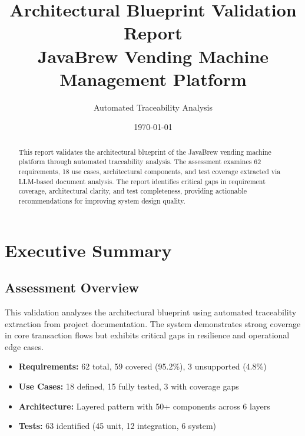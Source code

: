 \documentclass[11pt,a4paper]{article}
\title{\textbf{Architectural Blueprint Validation Report}\\
\large JavaBrew Vending Machine Management Platform}
\author{Automated Traceability Analysis}
\date{\today}
\begin{document}
\maketitle

\begin{abstract}
This report validates the architectural blueprint of the JavaBrew vending machine platform through automated traceability analysis. The assessment examines 62 requirements, 18 use cases, architectural components, and test coverage extracted via LLM-based document analysis. The report identifies critical gaps in requirement coverage, architectural clarity, and test completeness, providing actionable recommendations for improving system design quality.
\end{abstract}

\tableofcontents
\newpage

\section{Executive Summary}

\subsection{Assessment Overview}

This validation analyzes the architectural blueprint using automated traceability extraction from project documentation. The system demonstrates strong coverage in core transaction flows but exhibits critical gaps in resilience and operational edge cases.

\begin{tcolorbox}[colback=infocolor!5,colframe=infocolor,title=\textbf{Key Metrics}]
\begin{itemize}[leftmargin=*]
    \item \textbf{Requirements:} 62 total, 59 covered (95.2\%), 3 unsupported (4.8\%)
    \item \textbf{Use Cases:} 18 defined, 15 fully tested, 3 with coverage gaps
    \item \textbf{Architecture:} Layered pattern with 50+ components across 6 layers
    \item \textbf{Tests:} 63 identified (45 unit, 12 integration, 6 system)
\end{itemize}
\end{tcolorbox}
\end{document}
